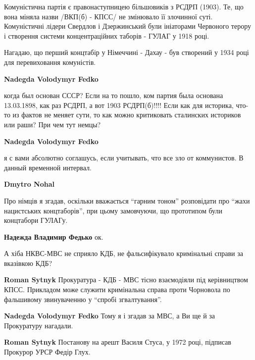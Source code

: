 \begin{itemize}
\begin{itemize}
Комуністична партія є правонаступницею більшовиків з РСДРП (1903). Те, що вона
міняла назви /ВКП(б) - КПСС/ не змінювало її злочинної суті. Комуністичні
лідери Свердлов і Дзержинський були ініаторами Червоного терору і створення
системи концентраційних таборів - ГУЛАГ у 1918 році.

Нагадаю, що перший концтабір у Німеччині - Дахау - був створений у 1934 році
для перевиховання комуністів.

\begin{itemize} %
\textbf{Nadegda Volodymyr Fedko} 

когда был основан СССР? Если на то пошло, ком партия была основана 13.03.1898,
как раз РСДРП, а вот 1903 РСДРП(б)!!!! Если как для историка, что-то из фактов
не меняет сути, то как можно критиковать сталинских историков или раши? При чем
тут немцы?


\textbf{Nadegda Volodymyr Fedko} 

я с вами абсолютно соглашусь, если учитывать, что все зло от коммунистов. В
данный временной интервал.


\textbf{Dmytro Nohal} 

Про німців я згадав, оскільки вважається \enquote{гарним тоном} розповідати про
\enquote{жахи нацистських концтаборів}, при цьому замовчуючи, що прототипом
були концтабори ГУЛАГу.


\textbf{Надежда Владимир Федько} ок.

\end{itemize} %

\end{itemize} %


А хіба НКВС-МВС не сприяло КДБ, не фальсифікувало кримінальні справи за
вказівкою КДБ?

\begin{itemize} %
\textbf{Roman Sytnyk} Прокуратура - КДБ - МВС тісно взаємодіяли під керівництвом КПСС.
Прикладом може служити кримінальна справа проти Чорновола по фальшивому звинуваченню у \enquote{спробі згвалтування}.

\textbf{Nadegda Volodymyr Fedko} Тому я і згадав за МВС, а Ви ще й за Прокуратуру нагадали.

\textbf{Roman Sytnyk} Постанову на арешт Василя Стуса, у 1972 році, підписав Прокурор УРСР Федір Глух.
\end{itemize} %


\end{itemize}
